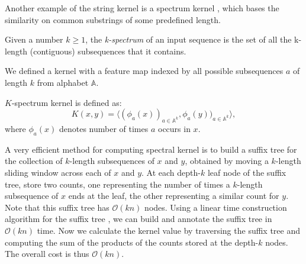 Another example of the string kernel is a spectrum kernel \cite{spectrumKernel}, which bases the similarity on common substrings of some predefined length.
\begin{definition}
	Given a number $k \ge 1$, the \emph{k-spectrum} of an input sequence is the set of all the k-length (contiguous) subsequences that it contains.
\end{definition}
We defined a kernel with a feature map indexed by all possible subsequences $a$ of length $k$ from alphabet $\mathbb{A}$.
\begin{definition}
	\emph{$K$}-spectrum kernel is defined as:
	\begin{equation*}
	K(x,y) = \langle (\phi_a(x))_{a \in \mathbb{A}^k}, \phi_a(y))_{a \in \mathbb{A}^k} \rangle,
	\end{equation*}
	where $\phi_a(x)$ denotes number of times $a$ occurs in $x$.
\end{definition}
A very efficient method for computing spectral kernel is to build a suffix tree for the collection of $k$-length subsequences of $x$ and $y$, obtained by moving a $k$-length sliding window across each of $x$ and $y$. At each depth-$k$ leaf node of the suffix tree, store two counts, one representing the number of times a $k$-length subsequence of $x$ ends at the leaf, the other representing a similar count for $y$. Note that this suffix tree has $\mathcal{O}(kn)$ nodes. Using a linear time construction algorithm for the suffix tree \cite{onlineConstructionOfSuffixTrees}, we can build and annotate the suffix tree in  $\mathcal{O}(kn)$ time. Now we calculate the kernel value by traversing the suffix tree and computing the sum of the products of the counts stored at the depth-$k$ nodes. The overall cost is thus $\mathcal{O}(kn)$. 

